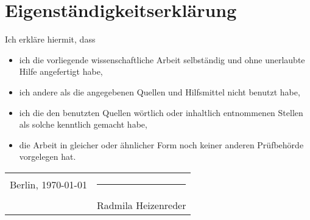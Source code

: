 \chapter{Eigenständigkeitserklärung}
\noindent Ich erkläre hiermit, dass
\begin{itemize}
    \item ich die vorliegende wissenschaftliche Arbeit selbständig und ohne unerlaubte Hilfe angefertigt habe,
    \item ich andere als die angegebenen Quellen und Hilfsmittel nicht benutzt habe,
    \item ich die den benutzten Quellen wörtlich oder inhaltlich entnommenen Stellen als solche kenntlich gemacht habe,
    \item die Arbeit in gleicher oder ähnlicher Form noch keiner anderen Prüfbehörde vorgelegen hat.
\end{itemize}
\vspace{2cm}
\begin{tabular}{@{}p{}p{}@{}}
    Berlin, \today & \hfill \rule{6cm}{0.4pt} \\
    & \hfill Radmila Heizenreder \\
\end{tabular}

